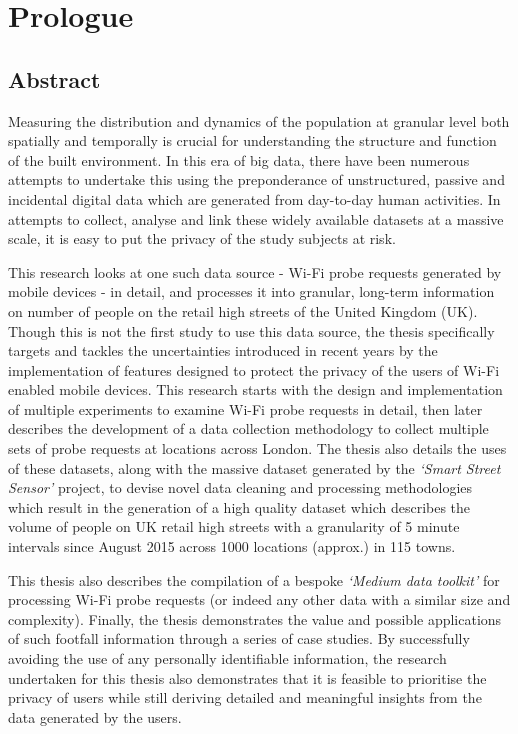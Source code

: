 \chapter*{Prologue}

\section*{Abstract} 

Measuring the distribution and dynamics of the population at granular level both spatially and temporally is crucial for understanding the structure and function of the built environment.
In this era of big data, there have been numerous attempts to undertake this using the preponderance of unstructured, passive and incidental digital data which are generated from day-to-day human activities.
In attempts to collect, analyse and link these widely available datasets at a massive scale, it is easy to put the privacy of the study subjects at risk.

This research looks at one such data source - Wi-Fi probe requests generated by mobile devices - in detail, and processes it into granular, long-term information on number of people on the retail high streets of the United Kingdom (UK).
Though this is not the first study to use this data source, the thesis specifically targets and tackles the uncertainties introduced in recent years by the implementation of features designed to protect the privacy of the users of Wi-Fi enabled mobile devices.
This research starts with the design and implementation of multiple experiments to examine Wi-Fi probe requests in detail, then later describes the development of a data collection methodology to collect multiple sets of probe requests at locations across London.
The thesis also details the uses of these datasets, along with the massive dataset generated by the \textit{`Smart Street Sensor'} project, to devise novel data cleaning and processing methodologies which result in the generation of a high quality dataset which describes the volume of people on UK retail high streets with a granularity of 5 minute intervals since August 2015 across 1000 locations (approx.) in 115 towns.

This thesis also describes the compilation of a bespoke \textit{`Medium data toolkit'} for processing Wi-Fi probe requests (or indeed any other data with a similar size and complexity).
Finally, the thesis demonstrates the value and possible applications of such footfall information through a series of case studies.
By successfully avoiding the use of any personally identifiable information, the research undertaken for this thesis also demonstrates that it is feasible to prioritise the privacy of users while still deriving detailed and meaningful insights from the data generated by the users.


